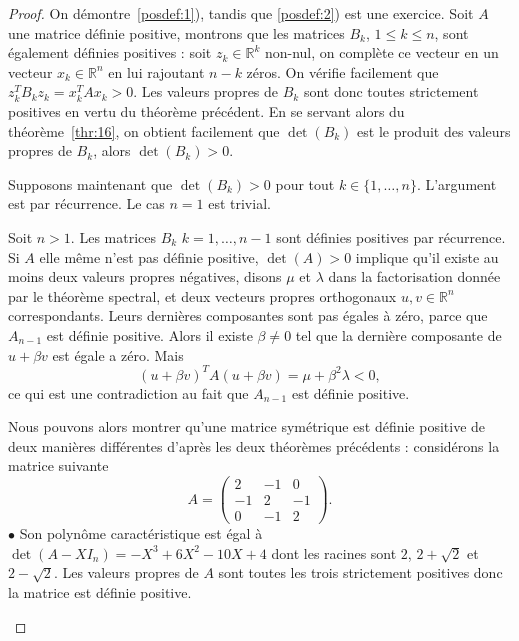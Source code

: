 \begin{proof}

On démontre~\ref{posdef:1}), tandis que \ref{posdef:2}) est une exercice. 
Soit $A$ une matrice définie positive, montrons que   
les matrices $B_k$, $ 1 \leq k \leq n$,  sont également définies positives : soit $z_k \in \mathbb R^k$ non-nul, 
on complète ce vecteur en un vecteur $x_k \in \mathbb R^n$ en lui rajoutant $n-k$ zéros.
On vérifie facilement que $z_k^T B_k z_k = x_k^T A x_k > 0$. 
Les valeurs propres de $B_k$ sont donc toutes strictement positives en vertu du théorème précédent. 
En se servant alors du théorème~\ref{thr:16}, on obtient facilement que $\det(B_k)$ est le produit des valeurs propres de $B_k$, alors $\det(B_k)>0$. 

Supposons maintenant que $\det(B_k)>0$ pour tout $k \in \{1,\dots,n\}$.
L'argument est par récurrence. Le cas $n=1$ est trivial.

Soit $n>1$. Les matrices $B_k$ $k=1,\dots,n-1$ sont définies positives par récurrence. Si $A$ elle même n'est pas définie positive, $\det(A)>0$ implique qu'il existe au moins deux valeurs propres négatives, disons $μ$ et $λ$ dans la factorisation donnée par le théorème spectral, et deux vecteurs propres orthogonaux $u,v ∈ ℝ^n$ correspondants.  Leurs dernières composantes sont pas égales à zéro, parce que $A_{n-1}$ est définie positive. Alors il existe $β ≠ 0$ tel que la dernière composante de $u+ β v$ est égale a zéro. Mais
\begin{displaymath}
  (u+ β v)^T A (u+ β v) = μ + β^2 λ <0,
\end{displaymath}
ce qui est une contradiction  au fait que $A_{n-1}$ est définie positive. 

\begin{example}
  \label{exe:18}
  Nous pouvons alors montrer qu'une matrice symétrique est définie positive de deux manières différentes d'après les deux théorèmes précédents : considérons la matrice suivante
  \begin{displaymath}
    A =
    \begin{pmatrix}
    2 & -1  & 0 \\
      -1 & 2 & -1 \\
      0 & -1 & 2 
    \end{pmatrix}. 
  \end{displaymath}
$\bullet$ Son polynôme caractéristique est égal à $\det(A-XI_n)=-X^3+6X^2-10X+4$ dont les racines sont $2$, $2+\sqrt{2}$ et $2-\sqrt{2}$. Les valeurs propres de $A$ sont toutes les trois strictement positives donc la matrice est définie positive.


\end{example}
\end{proof}

